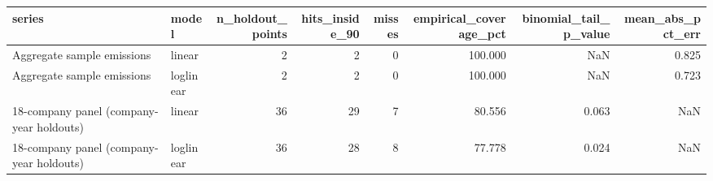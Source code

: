 \begin{tabular}{llrrrrrr}
\toprule
series & model & n_holdout_points & hits_inside_90 & misses & empirical_coverage_pct & binomial_tail_p_value & mean_abs_pct_err \\
\midrule
Aggregate sample emissions & linear & 2 & 2 & 0 & 100.000 & NaN & 0.825 \\
Aggregate sample emissions & loglinear & 2 & 2 & 0 & 100.000 & NaN & 0.723 \\
18-company panel (company-year holdouts) & linear & 36 & 29 & 7 & 80.556 & 0.063 & NaN \\
18-company panel (company-year holdouts) & loglinear & 36 & 28 & 8 & 77.778 & 0.024 & NaN \\
\bottomrule
\end{tabular}

